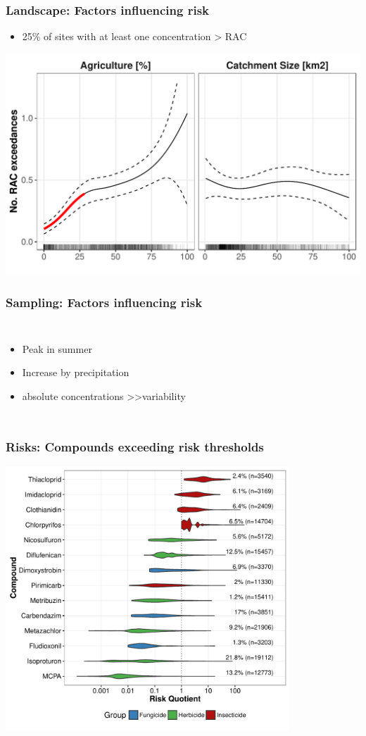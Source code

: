 \documentclass[
	10pt
	]{beamer}
\begin{document}
\begin{frame}
\frametitle{Landscape: Factors influencing risk}
	\begin{itemize}
		\item 25\% of sites with at least one concentration > RAC
	\end{itemize}
	\includegraphics[width = 1\textwidth]{figs/agri_size_eff.pdf}
\end{frame}

\begin{frame}
\frametitle{Sampling: Factors influencing risk}
	\begin{columns}
			\resizebox{1.1\textwidth}{!}{%
				}
	    	\begin{itemize}
	    		\item Peak in summer
	    		\item Increase by \alert{precipitation}
	    		\item absolute concentrations \textgreater\textgreater variability
	    	\end{itemize}
	\end{columns}
\end{frame}



\begin{frame}
\frametitle{Risks: Compounds exceeding risk thresholds}
	\includegraphics[width = 0.8\textwidth]{figs/compounds.pdf}
\end{frame}
\end{document}
